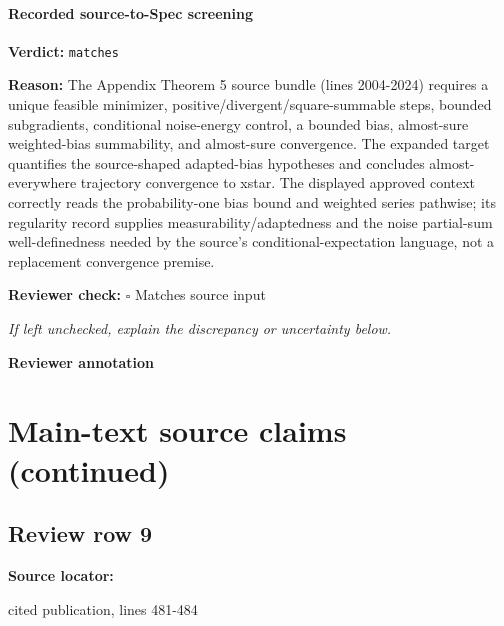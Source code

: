 \documentclass[10pt]{article}
\newcommand{\reviewerbox}{%
  \par\noindent\fbox{\parbox{0.96\linewidth}{\rule{0pt}{0.38in}}}\par
}
\newcommand{\reviewmatch}[1]{%
  \par\noindent\textbf{Reviewer check:} $\square$\; #1\par
  \noindent\emph{If left unchecked, explain the discrepancy or uncertainty below.}\par
}
\begin{document}
\paragraph{Recorded source-to-Spec screening}
\textbf{Verdict:} \texttt{matches}
\\
{\raggedright
\textbf{Reason:} The Appendix Theorem 5 source bundle (lines 2004-\allowbreak{}2024) requires a unique feasible minimizer, positive/\allowbreak{}divergent/\allowbreak{}square-\allowbreak{}summable steps, bounded subgradients, conditional noise-\allowbreak{}energy control, a bounded bias, almost-\allowbreak{}sure weighted-\allowbreak{}bias summability, and almost-\allowbreak{}sure convergence.\allowbreak{} The expanded target quantifies the source-\allowbreak{}shaped adapted-\allowbreak{}bias hypotheses and concludes almost-\allowbreak{}everywhere trajectory convergence to xstar.\allowbreak{} The displayed approved context correctly reads the probability-\allowbreak{}one bias bound and weighted series pathwise;\allowbreak{} its regularity record supplies measurability/\allowbreak{}adaptedness and the noise partial-\allowbreak{}sum well-\allowbreak{}definedness needed by the source's conditional-\allowbreak{}expectation language, not a replacement convergence premise.\allowbreak{}
\par}
\reviewmatch{Matches source input}
\noindent\textbf{Reviewer annotation}\par
\reviewerbox
\clearpage
\hypertarget{source-claim-e1093888fe362fdc}{}
\hypertarget{source-section-c08c7eca66416a2f}{}
\section*{Main-text source claims (continued)}
\subsection*{Review row 9}
\textbf{Source locator:} {\footnotesize\raggedright cited publication, lines 481-\allowbreak{}484\par}
\end{document}
